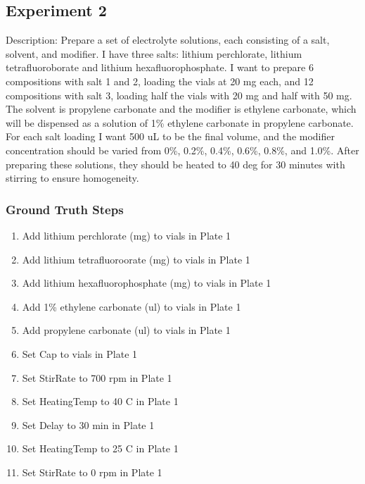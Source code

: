 \documentclass[sn-nature, twocolumn]{sn-jnl}%
\theoremstyle{thmstyleone}%
\theoremstyle{thmstyletwo}%
\theoremstyle{thmstylethree}%
\begin{document}
\subsection{Experiment 2}
Description: Prepare a set of electrolyte solutions, each consisting of a salt, solvent, and modifier. I
have three salts: lithium perchlorate, lithium tetrafluoroborate and lithium hexafluorophosphate. I want to prepare
6 compositions with salt 1 and 2, loading the vials at 20 mg each, and 12 compositions with salt 3, loading half the
vials with 20 mg and half with 50 mg. The solvent is propylene carbonate and the modifier is ethylene carbonate,
which will be dispensed as a solution of 1\% ethylene carbonate in propylene carbonate. For each salt loading I want
500 uL to be the final volume, and the modifier concentration should be varied from 0\%, 0.2\%, 0.4\%, 0.6\%, 0.8\%,
and 1.0\%. After preparing these solutions, they should be heated to 40 deg for 30 minutes with stirring to ensure
homogeneity. 

\subsubsection*{Ground Truth Steps}

\begin{enumerate}[itemsep=0pt]
    \item Add lithium perchlorate (mg) to vials in Plate 1
      \item Add lithium tetrafluoroorate (mg) to vials in Plate 1
      \item Add lithium hexafluorophosphate (mg) to vials in Plate 1
      \item Add 1\% ethylene carbonate (ul) to vials in Plate 1
      \item Add propylene carbonate (ul) to vials in Plate 1
      \item Set Cap to vials in Plate 1
      \item Set StirRate to 700 rpm in Plate 1
      \item Set HeatingTemp to 40 C in Plate 1
      \item Set Delay to 30 min in Plate 1
      \item Set HeatingTemp to 25 C in Plate 1
      \item Set StirRate to 0 rpm in Plate 1
\end{enumerate}
\end{document}
